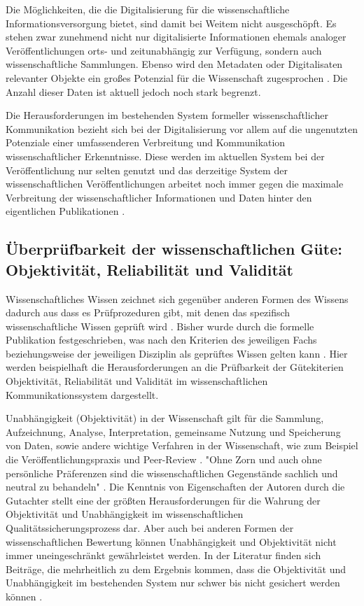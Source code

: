 Die Möglichkeiten, die die Digitalisierung für die wissenschaftliche Informationsversorgung bietet, sind damit bei Weitem nicht ausgeschöpft. Es stehen zwar zunehmend nicht nur digitalisierte Informationen ehemals analoger Veröffentlichungen orts- und zeitunabhängig zur Verfügung, sondern auch wissenschaftliche Sammlungen. Ebenso wird den Metadaten oder Digitalisaten relevanter Objekte ein großes Potenzial für die Wissenschaft zugesprochen \cite{Winkler_2011}. Die Anzahl dieser Daten ist aktuell jedoch noch stark begrenzt.

Die Herausforderungen im bestehenden System formeller wissenschaftlicher Kommunikation bezieht sich bei der Digitalisierung vor allem auf die ungenutzten Potenziale einer umfassenderen Verbreitung und Kommunikation wissenschaftlicher Erkenntnisse. Diese werden im aktuellen System bei der Veröffentlichung nur selten genutzt und das derzeitige System der wissenschaftlichen Veröffentlichungen arbeitet noch immer gegen die maximale Verbreitung der wissenschaftlicher Informationen und Daten hinter den eigentlichen Publikationen \cite{Molloy_2011}.

\subsection{Überprüfbarkeit der wissenschaftlichen Güte: Objektivität, Reliabilität und Validität}

Wissenschaftliches Wissen zeichnet sich gegenüber anderen Formen des Wissens dadurch aus dass es Prüfprozeduren gibt, mit denen das spezifisch wissenschaftliche Wissen geprüft wird \cite{Luhmann_1998}. Bisher wurde durch die formelle Publikation festgeschrieben, was nach den Kriterien des jeweiligen Fachs beziehungsweise der jeweiligen Disziplin als geprüftes Wissen gelten kann \cite[:11]{BBAW_2015}. Hier werden beispielhaft die Herausforderungen an die Prüfbarkeit der Gütekiterien Objektivität, Reliabilität und Validität im wissenschaftlichen  Kommunikationssystem dargestellt.

Unabhängigkeit (Objektivität) in der Wissenschaft gilt für die Sammlung, Aufzeichnung, Analyse, Interpretation, gemeinsame Nutzung und Speicherung von Daten, sowie andere wichtige Verfahren in der Wissenschaft, wie zum Beispiel die Veröffentlichungspraxis und Peer-Review \cite{Resnik_2005}. "Ohne Zorn und auch ohne persönliche Präferenzen sind die wissenschaftlichen Gegenstände sachlich und neutral zu behandeln" \cite[:9]{Gruber_2005}. Die Kenntnis von Eigenschaften der Autoren durch die Gutachter stellt eine der größten Herausforderungen für die Wahrung der Objektivität und Unabhängigkeit im wissenschaftlichen Qualitätssicherungsprozess dar. Aber auch bei anderen Formen der wissenschaftlichen Bewertung können Unabhängigkeit und Objektivität nicht immer uneingeschränkt gewährleistet werden. In der Literatur finden sich Beiträge, die mehrheitlich zu dem Ergebnis kommen, dass die Objektivität und Unabhängigkeit im bestehenden System nur schwer bis nicht gesichert werden können \cite{Binswanger_2014}.

